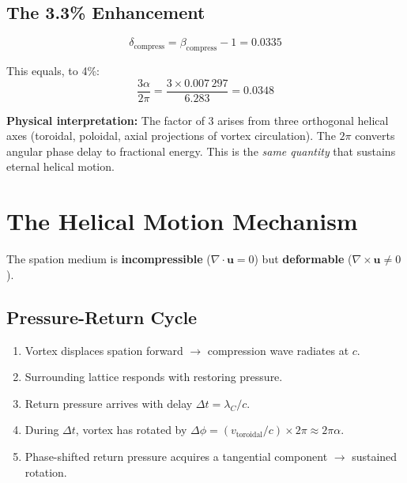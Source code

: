 \subsection{The 3.3\% Enhancement}

\begin{equation}\label{eq:delta-compress}
  \delta_{\text{compress}} = \beta_{\text{compress}} - 1 = 0.0335
\end{equation}

This equals, to 4\%:
\begin{equation}\label{eq:3alpha2pi}
  \frac{3\alpha}{2\pi} = \frac{3 \times 0.007\,297}{6.283} = 0.0348
\end{equation}

\textbf{Physical interpretation:} The factor of 3 arises from three orthogonal helical axes (toroidal, poloidal, axial projections of vortex circulation).  The $2\pi$ converts angular phase delay to fractional energy.  This is the \emph{same quantity} that sustains eternal helical motion.


\section{The Helical Motion Mechanism}

The spation medium is \textbf{incompressible} ($\nabla \cdot \mathbf{u} = 0$) but \textbf{deformable} ($\nabla \times \mathbf{u} \neq 0$).

\subsection{Pressure-Return Cycle}

\begin{enumerate}
  \item Vortex displaces spation forward $\to$ compression wave radiates at $c$.
  \item Surrounding lattice responds with restoring pressure.
  \item Return pressure arrives with delay $\Delta t = \lambda_C / c$.
  \item During $\Delta t$, vortex has rotated by $\Delta\phi = (v_{\text{toroidal}}/c) \times 2\pi \approx 2\pi\alpha$.
  \item Phase-shifted return pressure acquires a tangential component $\to$ sustained rotation.
\end{enumerate}

